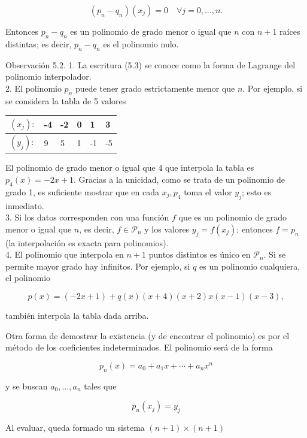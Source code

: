 \documentclass[10pt]{article}
\begin{document}
$$
\left(p_{n}-q_{n}\right)\left(x_{j}\right)=0 \quad \forall j=0, \ldots, n .
$$

Entonces $p_{n}-q_{n}$ es un polinomio de grado menor o igual que $n$ con $n+1$ raíces distintas; es decir, $p_{n}-q_{n}$ es el polinomio nulo.

Observación 5.2. 1. La escritura (5.3) se conoce como la forma de Lagrange del polinomio interpolador.\\
2. El polinomio $p_{n}$ puede tener grado estrictamente menor que $n$. Por ejemplo, si se considera la tabla de 5 valores

\begin{center}
\begin{tabular}{|l||l|l|l|l|l|}
\hline
$\left(x_{j}\right):$ & -4 & -2 & 0 & 1 & 3 \\
\hline
$\left(y_{j}\right):$ & 9 & 5 & 1 & -1 & -5 \\
\hline
\end{tabular}
\end{center}

El polinomio de grado menor o igual que 4 que interpola la tabla es $p_{4}(x)=-2 x+1$. Gracias a la unicidad, como se trata de un polinomio de grado 1, es suficiente mostrar que en cada $x_{j}, p_{4}$ toma el valor $y_{j}$; esto es inmediato.\\
3. Si los datos corresponden con una función $f$ que es un polinomio de grado menor o igual que $n$, es decir, $f \in \mathcal{P}_{n}$ y los valores $y_{j}=f\left(x_{j}\right)$; entonces $f=p_{n}$ (la interpolación es exacta para polinomios).\\
4. El polinomio que interpola en $n+1$ puntos distintos es único en $\mathcal{P}_{n}$. Si se permite mayor grado hay infinitos. Por ejemplo, si $q$ es un polinomio cualquiera, el polinomio

$$
p(x)=(-2 x+1)+q(x)(x+4)(x+2) x(x-1)(x-3),
$$

también interpola la tabla dada arriba.

Otra forma de demostrar la existencia (y de encontrar el polinomio) es por el método de los coeficientes indeterminados. El polinomio será de la forma

$$
p_{n}(x)=a_{0}+a_{1} x+\cdots+a_{n} x^{n}
$$

y se buscan $a_{0}, \ldots, a_{n}$ tales que

$$
p_{n}\left(x_{j}\right)=y_{j}
$$

Al evaluar, queda formado un sistema $(n+1) \times(n+1)$
\end{document}
